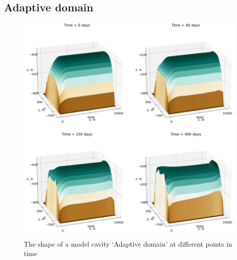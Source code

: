 

\subsection{Adaptive domain} \label{sec:adaptive_dom_results}


\begin{figure}[!ht]
\centering
\includegraphics[width=1\textwidth]{chapters/4/adaptive_domain.png}
\caption[]{The shape of a model cavity `Adaptive domain' at different points in time}
\label{fig:adaptive_domain}
\end{figure}

